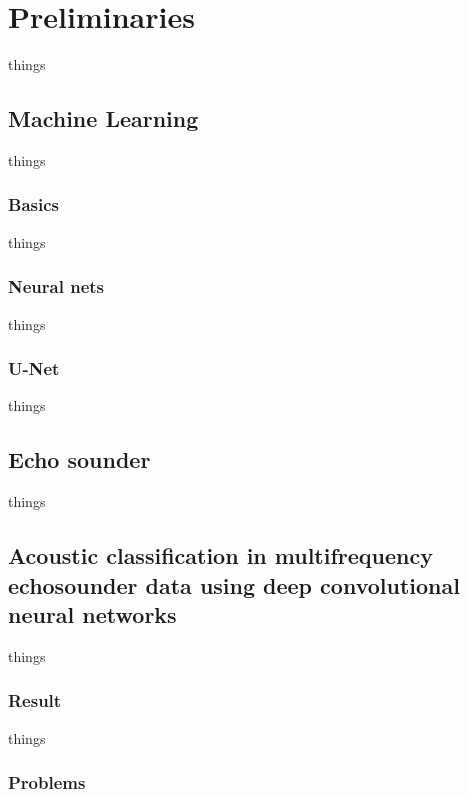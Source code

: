 \chapter{Preliminaries}
    things
    
\section{Machine Learning}
    things
    \subsection{Basics}
        things
    \subsection{Neural nets}
        things
    \subsection{U-Net}
        things

\section{Echo sounder}
    things
    
    
\section{Acoustic classification in multifrequency echosounder data using deep convolutional neural networks}
    
    things
    \subsection{Result}
        things
    \subsection{Problems}
        
    